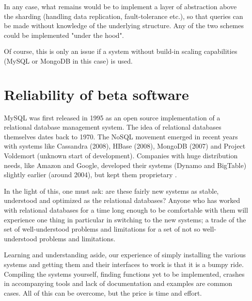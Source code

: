In any case, what remains would be to implement a layer of abstraction above the sharding (handling data replication, fault-tolerance etc.), so that queries can be made without knowledge of the underlying structure. Any of the two schemes could be implemented "under the hood".

Of course, this is only an issue if a system without build-in scaling capabilities (MySQL or MongoDB in this case) is used.

\section{Reliability of beta software}

MySQL was first released in 1995 as an open source implementation of a relational database management system. The idea of relational databases themselves dates back to 1970. The NoSQL movement emerged in recent years with systems like Cassandra (2008), HBase (2008), MongoDB (2007) and Project Voldemort (unknown start of development). Companies with huge distribution needs, like Amazon and Google, developed their systems (Dynamo and BigTable) slightly earlier (around 2004), but kept them proprietary \cite{BigTable}\cite{Dynamo}.

In the light of this, one must ask: are these fairly new systems as stable, understood and optimized as the relational databases? Anyone who has worked with relational databases for a time long enough to be comfortable with them will experience one thing in particular in switching to the new systems; a trade of the set of well-understood problems and limitations for a set of not so well-understood problems and limitations.

Learning and understanding aside, our experience of simply installing the various systems and getting them and their interfaces to work is that it is a bumpy ride. Compiling the systems yourself, finding functions yet to be implemented, crashes in accompanying tools and lack of documentation and examples are common cases. All of this can be overcome, but the price is time and effort.


